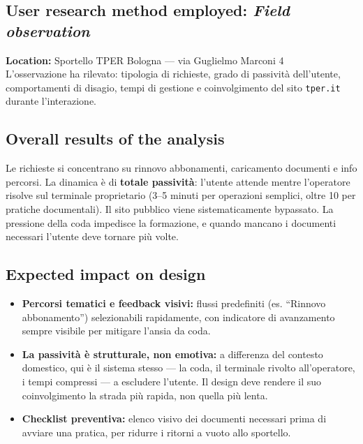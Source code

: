 ﻿\documentclass[11pt,a4paper]{article}
\begin{document}
\subsection*{User research method employed: \textit{Field observation}}
\begin{tcolorbox}[base]
\textbf{Location:} Sportello TPER Bologna --- via Guglielmo Marconi 4
\\[0.3cm]
L'osservazione ha rilevato: tipologia di richieste, grado di passività
dell'utente, comportamenti di disagio, tempi di gestione e
coinvolgimento del sito \texttt{tper.it} durante l'interazione.
\end{tcolorbox}

\subsection*{Overall results of the analysis}
\begin{tcolorbox}[base]
Le richieste si concentrano su rinnovo abbonamenti, caricamento
documenti e info percorsi. La dinamica è di \textbf{totale passività}:
l'utente attende mentre l'operatore risolve sul terminale proprietario
(3--5 minuti per operazioni semplici, oltre 10 per pratiche documentali).
Il sito pubblico viene sistematicamente bypassato. La pressione della
coda impedisce la formazione, e quando mancano i documenti necessari
l'utente deve tornare più volte.
\end{tcolorbox}

\subsection*{Expected impact on design}
\begin{tcolorbox}[base]

\begin{itemize}[leftmargin=*,itemsep=6pt]

    \item \textbf{Percorsi tematici e feedback visivi:}
    flussi predefiniti (es. ``Rinnovo abbonamento'') selezionabili
    rapidamente, con indicatore di avanzamento sempre visibile per
    mitigare l'ansia da coda.

    \item \textbf{La passività è strutturale, non emotiva:}
    a differenza del contesto domestico, qui è il sistema stesso ---
    la coda, il terminale rivolto all'operatore, i tempi compressi ---
    a escludere l'utente. Il design deve rendere il suo coinvolgimento
    la strada più rapida, non quella più lenta.

    \item \textbf{Checklist preventiva:} elenco visivo dei documenti
    necessari prima di avviare una pratica, per ridurre i ritorni a
    vuoto allo sportello.

\end{itemize}
\end{tcolorbox}
\end{document}
